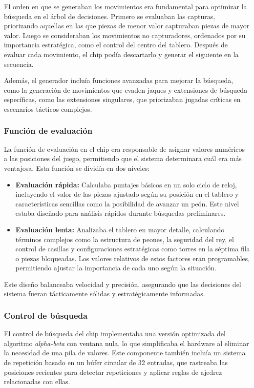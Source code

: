 \documentclass[12pt,a4paper]{article}
\begin{document}
El orden en que se generaban los movimientos era fundamental para optimizar la búsqueda en el árbol de decisiones. Primero se evaluaban las capturas, priorizando aquellas en las que piezas de menor valor capturaban piezas de mayor valor. Luego se consideraban los movimientos no capturadores, ordenados por su importancia estratégica, como el control del centro del tablero. Después de evaluar cada movimiento, el chip podía descartarlo y generar el siguiente en la secuencia.

Además, el generador incluía funciones avanzadas para mejorar la búsqueda, como la generación de movimientos que evaden jaques y extensiones de búsqueda específicas, como las extensiones singulares, que priorizaban jugadas críticas en escenarios tácticos complejos.

\subsubsection*{Función de evaluación}
La función de evaluación en el chip era responsable de asignar valores numéricos a las posiciones del juego, permitiendo que el sistema determinara cuál era más ventajosa. Esta función se dividía en dos niveles:
\begin{itemize}
    \item \textbf{Evaluación rápida:} Calculaba puntajes básicos en un solo ciclo de reloj, incluyendo el valor de las piezas ajustado según su posición en el tablero y características sencillas como la posibilidad de avanzar un peón. Este nivel estaba diseñado para análisis rápidos durante búsquedas preliminares.
    \item \textbf{Evaluación lenta:} Analizaba el tablero en mayor detalle, calculando términos complejos como la estructura de peones, la seguridad del rey, el control de casillas y configuraciones estratégicas como torres en la séptima fila o piezas bloqueadas. Los valores relativos de estos factores eran programables, permitiendo ajustar la importancia de cada uno según la situación.
\end{itemize}

Este diseño balanceaba velocidad y precisión, asegurando que las decisiones del sistema fueran tácticamente sólidas y estratégicamente informadas.

\subsubsection*{Control de búsqueda}
El control de búsqueda del chip implementaba una versión optimizada del algoritmo \textit{alpha-beta} \cite{knuth1975analysis} con ventana nula, lo que simplificaba el hardware al eliminar la necesidad de una pila de valores. Este componente también incluía un sistema de repetición basado en un búfer circular de 32 entradas, que rastreaba las posiciones recientes para detectar repeticiones y aplicar reglas de ajedrez relacionadas con ellas.
\end{document}
